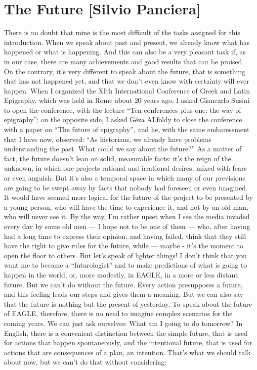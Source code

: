 \section{The Future [Silvio Panciera]}
There is no doubt that mine is the most difficult of the tasks assigned for this introduction. When we speak about past and present, we already know what has happened or what is happening. And this can also be a very pleasant task if, as in our case, there are many achievements and good results that can be praised.
On the contrary, it’s very different to speak about the future, that is something that has not happened yet, and that we don’t even know with certainty will ever happen. 
When I organized the XIth International Conference of Greek and Latin Epigraphy, which was held in Rome about 20 years ago, I asked Giancarlo Susini to open the conference, with the lecture ``Ten conferences plus one: the way of epigraphy''; on the opposite side, I asked Géza ALföldy to close the conference with a paper on ``The future of epigraphy'', and he, with the same embaressment that I have now, observed: ``As historians, we already have problems understanding the past. What could we say about the future?''
As a matter of fact, the future doesn’t lean on solid, measurable facts: it’s the reign of the unknown, in which one projects rational and irrational desires, mixed with fears or even anguish. But it’s also a temporal space in which many of our previsions are going to be swept away by facts that nobody had foreseen or even imagined.
It would have seemed more logical for the future of the project to be presented by a young person, who will have the time to experience it, and not by an old man, who will never see it. By the way, I’m rather upset when I see the media invaded every day by some old men --- I hope not to be one of them --- who, after having had a long time to express their opinion, and having failed, think that they still have the right to give rules for the future, while --- maybe - it’s the moment to open the floor to others.
But let’s speak of lighter things!
I don’t think that you want me to become a ``futurologist''  and to make predictions of what is going to happen in the world, or, more modestly, in EAGLE, in a more or less distant future. But we can’t do without the future.
Every action presupposes a future, and this feeling leads our steps and gives them a meaning. But we can also say that the future is nothing but the present of yesterday. To speak about the future of EAGLE, therefore, there is no need to imagine complex scenarios for the coming years. We can just ask ourselves: What am I going to do tomorrow? In English, there is a convenient distinction between the simple future, that is used for actions that happen spontaneously, and the intentional future, that is used for actions that are consequences of a plan, an intention. That’s what we should talk about now, but we can’t do that without considering:
